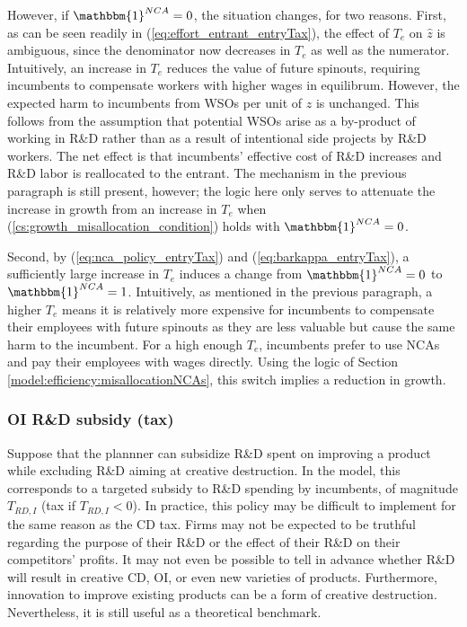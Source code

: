 \documentclass[11pt,english]{article}
\begin{document}
However, if $\mathbbm{1}^{NCA} = 0$, the situation changes, for two reasons. First, as can be seen readily in (\ref{eq:effort_entrant_entryTax}), the effect of $T_e$ on $\hat{z}$ is ambiguous, since the denominator now decreases in $T_e$ as well as the numerator. Intuitively, an increase in $T_e$ reduces the value of future spinouts, requiring incumbents to compensate workers with higher wages in equilibrum. However, the expected harm to incumbents from WSOs per unit of $z$ is unchanged. This follows from the assumption that potential WSOs arise as a by-product of working in R\&D rather than as a result of intentional side projects by R\&D workers. The net effect is that incumbents' effective cost of R\&D increases and R\&D labor is reallocated to the entrant. The mechanism in the previous paragraph is still present, however; the logic here only serves to attenuate the increase in growth from an increase in $T_e$ when (\ref{cs:growth_misallocation_condition}) holds with $\mathbbm{1}^{NCA} = 0$.

Second, by (\ref{eq:nca_policy_entryTax}) and (\ref{eq:barkappa_entryTax}), a sufficiently large increase in $T_e$ induces a change from $\mathbbm{1}^{NCA} = 0$ to $\mathbbm{1}^{NCA} = 1$. Intuitively, as mentioned in the previous paragraph, a higher $T_e$ means it is relatively more expensive for incumbents to compensate their employees with future spinouts as they are less valuable but cause the same harm to the incumbent. For a high enough $T_e$, incumbents prefer to use NCAs and pay their employees with wages directly. Using the logic of Section \ref{model:efficiency:misallocationNCAs}, this switch implies a reduction in growth.


\subsubsection{OI R\&D subsidy (tax)}

Suppose that the plannner can subsidize R\&D spent on improving a product while excluding R\&D aiming at creative destruction. In the model, this corresponds to a targeted subsidy to R\&D spending by incumbents, of magnitude $T_{RD,I}$ (tax if $T_{RD,I} < 0$). In practice, this policy may be difficult to implement for the same reason as the CD tax. Firms may not be expected to be truthful regarding the purpose of their R\&D or the effect of their R\&D on their competitors' profits. It may not even be possible to tell in advance whether R\&D will result in creative CD, OI, or even new varieties of products. Furthermore, innovation to improve existing products can be a form of creative destruction. Nevertheless, it is still useful as a theoretical benchmark.
\end{document}
